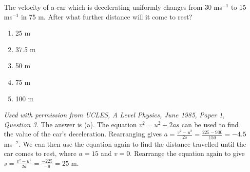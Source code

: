 \begin{problem}[A1985PIQ3l] 
{The velocity of a car which is decelerating uniformly changes from 30 ms$^{-1}$ to 15 ms$^{-1}$ in 75 m. After what further distance will it come to rest?
\begin{enumerate}
	\item 25 m
	\item 37.5 m
	\item 50 m
	\item 75 m
	\item100 m
\end{enumerate}
}
{\textit{Used with permission from UCLES, A Level Physics, June 1985, Paper 1, Question 3.}}
{The answer is (a). The equation $v^{2} = u^{2} + 2as$ can be used to find the value of the car's deceleration. Rearranging gives $a = \frac{v^{2} - u^{2}}{2s} = \frac{225 - 900}{150} = -4.5$ ms$^{-2}$. We can then use the equation again to find the distance travelled until the car comes to rest, where $u = 15$ and $v = 0$. Rearrange the equation again to give $s = \frac{v^{2} - u^{2}}{2a} = \frac{-225}{-9} = 25$ m.
}
\end{problem}